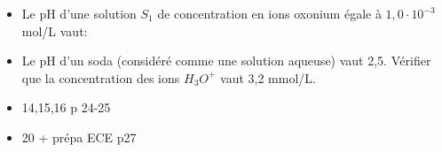 \begin{itemize}
\item Le pH d'une solution $S_1$ de concentration en ions oxonium égale à $1,0\cdot 10^{-3}$ mol/L vaut: 
\item Le pH d'un soda (considéré comme une solution aqueuse) vaut 2,5. Vérifier que la concentration des ions $H_3O^+$ vaut 3,2 mmol/L.
\end{itemize}

 {
\begin{itemize}
	\item 14,15,16 p 24-25 
	\item  20 + prépa ECE p27
\end{itemize}
}